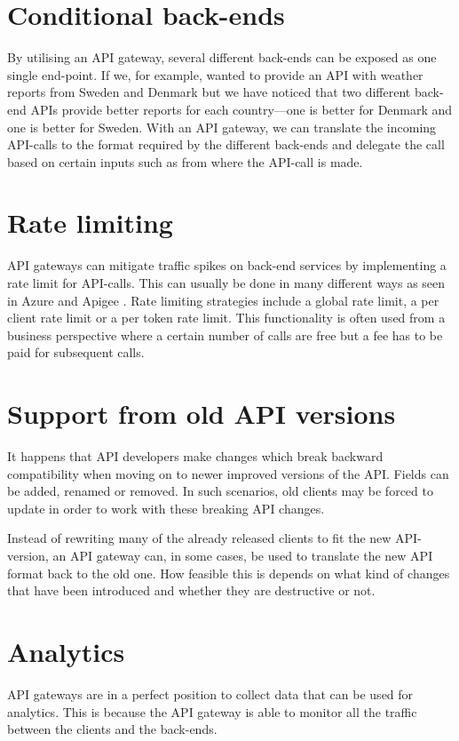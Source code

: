 \documentclass{cslthse-msc}
\begin{document}
\section{Conditional back-ends}
By utilising an API gateway, several different back-ends can be exposed as one single end-point. If we, for example, wanted to provide an API with weather reports from Sweden and Denmark but we have noticed that two different back-end APIs provide better reports for each country---one is better for Denmark and one is better for Sweden. With an API gateway, we can translate the incoming API-calls to the format required by the different back-ends and delegate the call based on certain inputs such as from where the API-call is made.

\section{Rate limiting}
API gateways can mitigate traffic spikes on back-end services by implementing a rate limit for API-calls. This can usually be done in many different ways as seen in Azure \cite{azure_rate_limit} and Apigee \cite{apigee_rate_limit}. Rate limiting strategies include a global rate limit, a per client rate limit or a per token rate limit. This functionality is often used from a business perspective where a certain number of calls are free but a fee has to be paid for subsequent calls.

\section{Support from old API versions}
It happens that API developers make changes which break backward compatibility when moving on to newer improved versions of the API. Fields can be added, renamed or removed. In such scenarios, old clients may be forced to update in order to work with these breaking API changes.

Instead of rewriting many of the already released clients to fit the new API-version, an API gateway can, in some cases, be used to translate the new API format back to the old one. How feasible this is depends on what kind of changes that have been introduced and whether they are destructive or not.

\section{Analytics}
API gateways are in a perfect position to collect data that can be used for analytics. This is because the API gateway is able to monitor all the traffic between the clients and the back-ends. 
\end{document}
